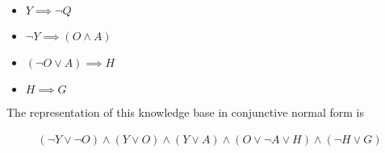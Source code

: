 \documentclass[]{article}
\begin{document}
\begin{itemize}
\item{$Y \implies \neg Q$}
\item{$\neg Y \implies (O \land A)$}
\item{$(\neg O \lor A) \implies H$}
\item{$H \implies G$}
\end{itemize}

The representation of this knowledge base in conjunctive normal form is

\begin{gather}
(\neg Y \lor \neg O) \land (Y \lor O) \land (Y \lor A) \land (O \lor \neg A \lor H) \land (\neg H \lor G)
\end{gather}
\end{document}
